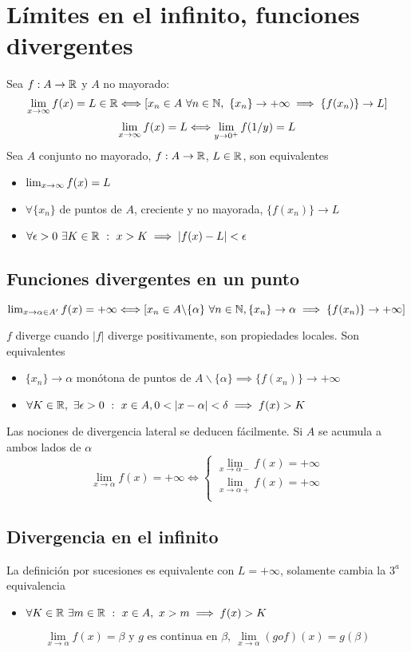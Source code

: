\section{Límites en el infinito, funciones divergentes}
Sea $f:A\rightarrow\mathbb{R}$ y $A$ no mayorado:
$$ \lim_{\substack{x\rightarrow\infty}} f(x) = L\in\mathbb{R} \Longleftrightarrow
 [x_n\in A \ \forall n\in\mathbb{N}, \ \{x_n\}\rightarrow+\infty \implies \{f(x_n)\} \rightarrow L]$$
$$ \lim_{\substack{x\rightarrow\infty}} f(x) = L \Longleftrightarrow \lim_{y\rightarrow0^+} f(1/y) = L $$
Sea $A$ conjunto no mayorado, $f:A\rightarrow\mathbb{R}$, $L\in\mathbb{R}$, son equivalentes
\begin{itemize}
	\item $\lim_{\substack{x\rightarrow\infty}} f(x) = L$
	\item $\forall\{x_n\}$ de puntos de $A$, creciente y no mayorada, $\{f(x_n)\}\rightarrow L$
	\item $\forall\epsilon>0 \ \exists K\in\mathbb{R} \ : \ x>K \implies |f(x)-L|<\epsilon$
\end{itemize}

\subsection{Funciones divergentes en un punto}
\begin{center}
$ \lim_{x\rightarrow\alpha\in A'} f(x) = +\infty \Longleftrightarrow
[x_n\in A\backslash\{\alpha\} \ \forall n\in\mathbb{N}, \{x_n\}\rightarrow\alpha \implies \{f(x_n)\}\rightarrow+\infty] $
\end{center}

 
$f$ diverge cuando $|f|$ diverge positivamente, son propiedades locales. Son equivalentes
\begin{itemize}
	\item $\{x_n\}\rightarrow\alpha$ monótona de puntos de $A\backslash\{\alpha\} \implies \{f(x_n)\} \rightarrow +\infty$
	\item $\forall K\in\R, \ \exists\epsilon>0 \ : \ x\in A, 0<|x-\alpha|<\delta \implies f(x)>K$
\end{itemize}
Las nociones de divergencia lateral se deducen fácilmente. Si $A$ se acumula a ambos lados de $\alpha$
$$ \lim_{x\rightarrow\alpha} f(x) = +\infty \Longleftrightarrow 
\left\lbrace
\begin{array}{l}
 \lim_{x\rightarrow\alpha-} f(x) = +\infty \\
 \lim_{x\rightarrow\alpha+} f(x) = +\infty \\
\end{array}
\right.
$$

\subsection{Divergencia en el infinito}
La definición por sucesiones es equivalente con $L=+\infty$, solamente cambia la $3^a$ equivalencia
\begin{itemize}
	\item $\forall K\in\R \ \exists m\in\R \ : \ x\in A, \  x>m \implies f(x)>K$
\end{itemize}
$$\lim_{x\rightarrow\alpha} f(x)=\beta \text{ y $g$ es continua en $\beta$}, \ \lim_{x\rightarrow\alpha} (gof)(x) = g(\beta)$$
